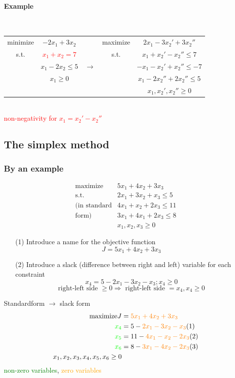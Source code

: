 \paragraph{Example} ~ \\
\begin{tabular}{ccccc}
minimize& $-2x_1+3x_2$ && maximize &$2x_1-3x_2'+3x_2''$ \\
s.t. & \textcolor{red}{$x_1+x_2 = 7$} && s.t. & $x_1+x_2'-x_2'' \leq 7$ \\
& $x_1-2x_2 \leq 5$ & $\rightarrow$ && $-x_1-x_2'+x_2'' \leq -7$ \\
& $x_1 \geq 0$ &&& $x_1-2x_2''+2x_2'' \leq 5$ \\
&&&& $x_1,x_2',x_2'' \geq 0$ \\
\end{tabular} \\
\textcolor{red}{non-negativity for $x_1=x_2'-x_2''$}

\subsection{The simplex method}

\subsubsection{By an example}
\begin{align*}
\text{maximize} & 5x_1+4x_2+3x_3 \\
\text{s.t.} & 2x_1+3x_2+x_3 \leq 5 \\
\text{(in standard} & 4x_1 + x_2 + 2x_3 \leq 11 \\
\text{form)} & 3x_1 + 4x_1 + 2x_3 \leq 8 \\
& x_1,x_2,x_3 \geq 0
\end{align*}
\begin{itemize}
\item[(1)] Introduce a name for the objective function 
$$J = 5x_1+4x_2+3x_3$$
\item[(2)] Introduce a slack (difference between right and left) variable for each constraint
$$x_4 = 5-2x_1-3x_2-x_3 ; x_4 \geq 0$$
$$\text{right-left side $\geq 0 \Rightarrow$ right-left side $=x_4, x_4 \geq 0$}$$
\end{itemize}
Standardform $\rightarrow$ slack form
\begin{align*}
\text{maximize} J &= \textcolor{orange}{5x_1 + 4x_2 + 3x_3} \\
\textcolor{green}{x_4} &= 5-\textcolor{orange}{2x_1-3x_2-x_3} (1) \\ 
\textcolor{green}{x_5} &= 11-\textcolor{orange}{4x_1-x_2-2x_3}  (2) \\
\textcolor{green}{x_6} &= 8-\textcolor{orange}{3x_1-4x_2-2x_3}  (3) \\
x_1,x_2,x_3,x_4,x_5,x_6 \geq 0
\end{align*}
\textcolor{green}{non-zero variables}, \textcolor{orange}{zero variables}
